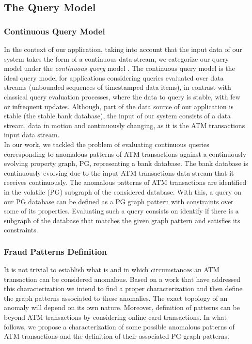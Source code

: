 \subsection{The Query Model}\label{section:queryModel}

\subsubsection*{Continuous Query Model}

In the context of our application, taking into account that the input data of our system takes the form of a continuous data stream, 
we categorize our query model under the \emph{continuous query} model \cite{CQ-babu2001continuous, CQ-zaniolo2012logical}. 
The continuous query model is the ideal query model for applications considering queries evaluated over data streams (unbounded sequences of timestamped data items), 
in contrast with classical query evaluation processes, where the data to query is stable, with few or infrequent updates. 
Although, part of the data source of our application is stable (the stable bank database), the input of our system consists of a data stream, 
data in motion and continuously changing, as it is the ATM transactions input data stream.\\ 

In our work, we tackled the problem of evaluating continuous queries corresponding to anomalous patterns of ATM transactions 
against a continuously evolving property graph, PG, representing a bank database. 
The bank database is continuously evolving due to the input ATM transactions data stream that it receives continuously. 
The anomalous patterns of ATM transactions are identified in the volatile (PG) subgraph of the considered database. 
With this, a query on our PG database can be defined as a PG graph pattern with constraints over some of its properties. 
Evaluating such a query consists on identify if there is a subgraph of the database that matches the given graph pattern and satisfies its constraints.

\iffalse
\subsubsection*{Fraud Patterns Definition}

It is not trivial to establish what is and in which circumstances an ATM transaction can be considered anomalous. Based on a work that have addressed this characterization \cite{FP-magdalena2021artificial} we intend to find a proper characterization and then define the graph patterns associated to these anomalies. The exact topology of an anomaly will depend on its own nature. Moreover, definition of patterns can be beyond ATM transactions by considering online card transactions. In what follows, we propose a characterization of some possible anomalous patterns of ATM transactions and the definition of their associated PG graph patterns. 

